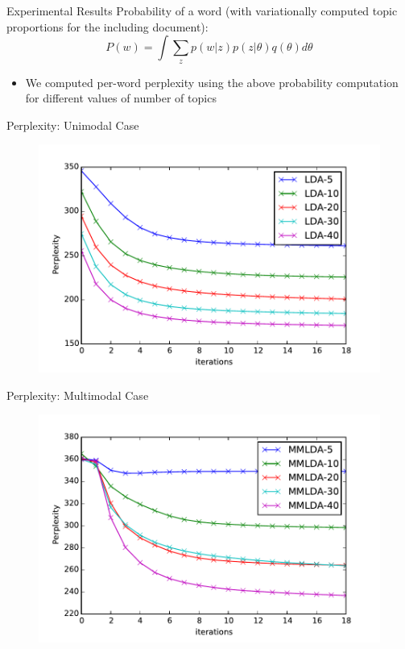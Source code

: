 \documentclass[pdf]{beamer}
\begin{document}
\begin{frame}{Experimental Results}
	Probability of a word (with variationally computed topic proportions for the including document):
	\begin{equation*}
	 	P(w) = \int \sum_z p(w|z) p(z|\theta)q(\theta)d\theta
	\end{equation*}
	\begin{itemize}
		\item We computed per-word perplexity using the above probability computation for different values of number of topics
	\end{itemize}
	
\end{frame}

\begin{frame}{Perplexity: Unimodal Case}
\begin{figure}
\label{fig:perpuni}
\includegraphics*[width=\textwidth]{perplex-uni.pdf}
\end{figure}
\end{frame}

\begin{frame}{Perplexity: Multimodal Case}
\begin{figure}
\label{fig:perpmulti}
\includegraphics*[width=\textwidth]{perplex-mm.pdf}
\end{figure}
\end{frame}
\end{document}

